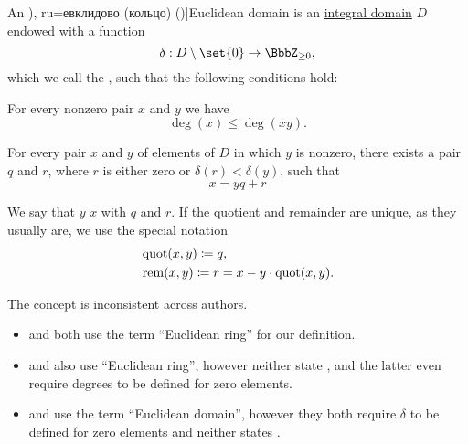 \begin{definition}\label{def:euclidean_domain}
  An \term[bg=евклидов (пръстен) (\cite[def. VI.2]{ГеновМиховскиМоллов1991Алгебра}), ru=евклидово (кольцо) (\cite[def. 3.5.2]{Винберг2014Алгебра})]{Euclidean domain} is an \hyperref[def:integral_domain]{integral domain} \( D \) endowed with a function
  \begin{equation*}
    \delta: D \setminus \set{ 0 } \to \BbbZ_{\geq 0},
  \end{equation*}
  which we call the , such that the following conditions hold:
  \begin{thmenum}
      For every nonzero pair \( x \) and \( y \) we have
    \begin{equation}\label{eq:def:euclidean_domain/multiplication}
      \deg(x) \leq \deg(xy).
    \end{equation}

     For every pair \( x \) and \( y \) of elements of \( D \) in which \( y \) is nonzero, there exists a pair \( q \) and \( r \), where \( r \) is either zero or \( \delta(r) < \delta(y) \), such that
    \begin{equation}\label{eq:def:euclidean_domain/division}
      x = yq + r
    \end{equation}
  \end{thmenum}

  We say that \( y \)  \( x \) with  \( q \) and  \( r \). If the quotient and remainder are unique, as they usually are, we use the special notation
  \begin{align*}
    &\operatorname{quot}(x, y) \coloneqq q, \\
    &\operatorname{rem}(x, y) \coloneqq r = x - y \cdot \operatorname{quot}(x, y).
  \end{align*}
\end{definition}
\begin{comments}
  \item The concept is inconsistent across authors.
  \begin{itemize}
    \item {} and  both use the term \enquote{Euclidean ring} for our definition.

    \item {} and  also use \enquote{Euclidean ring}, however neither state , and the latter even require degrees to be defined for zero elements.

    \item {} and  use the term \enquote{Euclidean domain}, however they both require \( \delta \) to be defined for zero elements and neither states .
  \end{itemize}
\end{comments}

